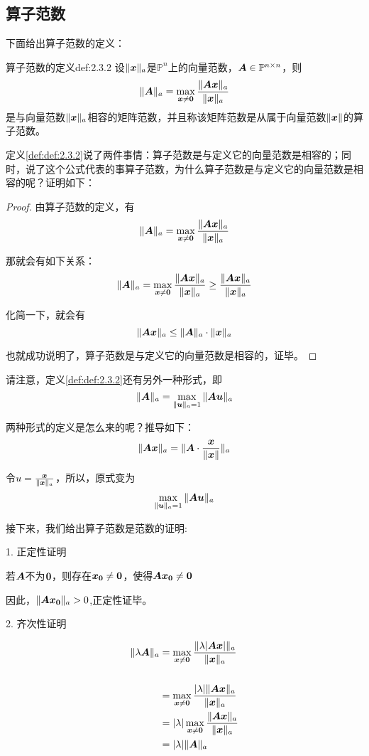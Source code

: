 \documentclass[12pt, a4paper, oneside, UTF8]{ctexbook}
\begin{document}
\subsection{算子范数}
下面给出算子范数的定义：
\begin{defn}{算子范数的定义}{def:2.3.2}
    设$\Vert\boldsymbol{x}\Vert_a$是$\mathbb{P}^n$上的向量范数，$\boldsymbol{A}\in\mathbb{P}^{n\times n}$，则\[\Vert\boldsymbol{A}\Vert_a=\max\limits_{\boldsymbol{x}\neq \boldsymbol{0}}\frac{\Vert\boldsymbol{Ax}\Vert_a}{\Vert\boldsymbol{x}\Vert_a}\]
    是与向量范数$\Vert\boldsymbol{x}\Vert_a$相容的矩阵范数，并且称该矩阵范数是从属于向量范数$\Vert\boldsymbol{x}\Vert$的算子范数。
\end{defn}

定义\ref{def:def:2.3.2}说了两件事情：算子范数是与定义它的向量范数是相容的；同时，说了这个公式代表的事算子范数，为什么算子范数是与定义它的向量范数是相容的呢？证明如下：

\begin{proof}
    由算子范数的定义，有\[\Vert\boldsymbol{A}\Vert_a=\max\limits_{\boldsymbol{x}\neq \boldsymbol{0}}\frac{\Vert\boldsymbol{Ax}\Vert_a}{\Vert\boldsymbol{x}\Vert_a}\]
    
    那就会有如下关系：
    \[\Vert\boldsymbol{A}\Vert_a=\max\limits_{\boldsymbol{x}\neq \boldsymbol{0}}\frac{\Vert\boldsymbol{Ax}\Vert_a}{\Vert\boldsymbol{x}\Vert_a}\geq\frac{\Vert\boldsymbol{Ax}\Vert_a}{\Vert\boldsymbol{x}\Vert_a}\]

    化简一下，就会有\[\Vert\boldsymbol{Ax}\Vert_a\leq \Vert\boldsymbol{A}\Vert_a\cdot\Vert\boldsymbol{x}\Vert_a\]

    也就成功说明了，算子范数是与定义它的向量范数是相容的，证毕。

\end{proof}
请注意，定义\ref{def:def:2.3.2}还有另外一种形式，即\[\Vert\boldsymbol{A}\Vert_a=\max\limits_{\Vert\boldsymbol{u}\Vert_a=1}\Vert\boldsymbol{Au}\Vert_a\]

两种形式的定义是怎么来的呢？推导如下：
\[\Vert\boldsymbol{Ax}\Vert_a=\Vert\boldsymbol{A}\cdot\frac{\boldsymbol{x}}{\Vert\boldsymbol{x}\Vert}\Vert_a\]

令$u=\frac{\boldsymbol{x}}{\Vert\boldsymbol{x}\Vert_a}$，所以，原式变为\[\max\limits_{\Vert\boldsymbol{u}\Vert_a=1}\Vert\boldsymbol{Au}\Vert_a\]

接下来，我们给出算子范数是范数的证明:

1. 正定性证明

若$\boldsymbol{A}$不为$\boldsymbol{0}$，则存在$\boldsymbol{x_0}\neq \boldsymbol{0}$，使得$\boldsymbol{Ax_0}\neq \boldsymbol{0}$

因此，$\Vert\boldsymbol{Ax_0}\Vert_a>0$,正定性证毕。

2. 齐次性证明

\[\begin{aligned}
\Vert\lambda\boldsymbol{A}\Vert_a&=\max\limits_{\boldsymbol{x}\neq \boldsymbol{0}}\frac{\Vert\lambda|\boldsymbol{Ax}|\Vert_a}{\Vert\boldsymbol{x}\Vert_a}\\\\
&=\max\limits_{\boldsymbol{x}\neq \boldsymbol{0}}\frac{|\lambda|\Vert\boldsymbol{Ax}\Vert_a}{\Vert\boldsymbol{x}\Vert_a}\\
&=|\lambda|\max\limits_{\boldsymbol{x}\neq \boldsymbol{0}}\frac{\Vert\boldsymbol{Ax}\Vert_a}{\Vert\boldsymbol{x}\Vert_a}\\
&=|\lambda|\Vert\boldsymbol{A}\Vert_a
\end{aligned}
\]
\end{document}
